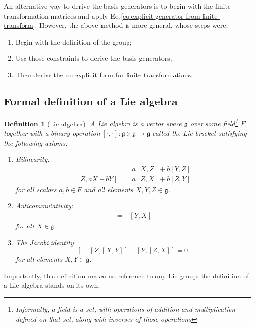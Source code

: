 \documentclass[11pt]{article}
\numberwithin{equation}{section}
\newtheorem{defn}{Definition}[section]
\begin{document}
An alternative way to derive the basis generators is to begin with the finite transformation matrices and apply Eq.\eqref{eq:explicit-generator-from-finite-transform}. However, the above method is more general, whose steps were: 
\begin{enumerate}[noitemsep]
\item Begin with the definition of the group;
\item Use those constraints to derive the basis generators; 
\item Then derive the an explicit form for finite transformations.
\end{enumerate}

\subsection{Formal definition of a Lie algebra}

\begin{defn}[Lie algebra]
A Lie algebra is a vector space $\mathfrak{g}$ over some field\footnote{Informally, a field is a set, with operations of addition and multiplication defined on that set, along with inverses of those operations} $F$ together with a binary operation $[\cdot, \cdot]: \mathfrak{g} \times \mathfrak{g} \rightarrow \mathfrak{g}$ called the Lie bracket satisfying the following axioms: \label{defn:Lie-algebra}
\begin{enumerate}
\item Bilinearity:
\begin{align}
[aX + bY, Z] &= a[X,Z] + b[Y,Z] \\
[Z, aX + bY] &= a[Z,X] + b[Z,Y]
\end{align}
for all scalars $a,b \in F$ and all elements $X,Y,Z \in \mathfrak{g}$.
\item Anticommutativity:
\begin{align}
[X,Y] = -[Y,X] 
\end{align}
for all $X \in \mathfrak{g}$.
\item The Jacobi identity
\begin{equation}
[X,[Y,Z]] + [Z,[X,Y]] + [Y,[Z,X]] = 0
\end{equation}
for all elements $X,Y \in \mathfrak{g}$.
\end{enumerate}
\end{defn}
Importantly, this definition makes no reference to any Lie group: the definition of a Lie algebra stands on its own.
\end{document}
